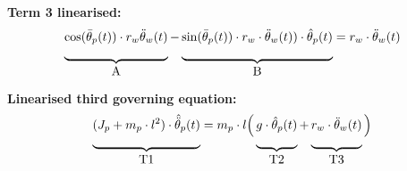 \textbf{Term 3 linearised:}
\begin{align*}
\underbrace{\cos(\bar{\theta}_p(t)) \cdot r_w \ddot \theta_w(t)\rule[-12pt]{0pt}{5pt}}_{\mbox{A}} - \underbrace{\sin(\bar{\theta}_p(t)) \cdot r_w \cdot \ddot \theta_w(t)) \cdot \hat{\theta}_p(t)\rule[-12pt]{0pt}{5pt}}_{\mbox{B}} = r_w \cdot \ddot \theta_w(t)
\end{align*}

\textbf{Linearised third governing equation:}
\begin{align}
\underbrace{(J_p+m_p\cdot l^2)\cdot \hat{\ddot \theta}_p(t)\rule[-12pt]{0pt}{5pt}}_{\mbox{T1}} = m_p \cdot l \Big(\underbrace{g \cdot \hat{\theta}_p(t)\rule[-12pt]{0pt}{5pt}}_{\mbox{T2}} + \underbrace{r_w \cdot \ddot \theta_w(t)\rule[-12pt]{0pt}{5pt}}_{\mbox{T3}}   
\Big)
\end{align}

